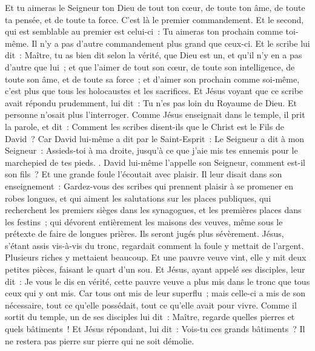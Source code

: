 \begin{multicols}{2}
Et tu aimeras le Seigneur ton Dieu de tout ton cœur, de toute ton âme, de toute ta pensée, et de toute ta force. C'est là le premier commandement.
Et le second, qui est semblable au premier est celui-ci~: Tu aimeras ton prochain comme toi-même. Il n'y a pas d'autre commandement plus grand que ceux-ci.
Et le scribe lui dit~: Maître, tu as bien dit selon la vérité, que Dieu est un, et qu'il n'y en a pas d'autre que lui~;
et que l'aimer de tout son cœur, de toute son intelligence, de toute son âme, et de toute sa force~; et d'aimer son prochain comme soi-même, c'est plus que tous les holocaustes et les sacrifices.
Et Jésus voyant que ce scribe avait répondu prudemment, lui dit~: Tu n'es pas loin du Royaume de Dieu. Et personne n'osait plus l'interroger.
Comme Jésus enseignait dans le temple, il prit la parole, et dit~: Comment les scribes disent-ils que le Christ est le Fils de David~?
Car David lui-même a dit par le Saint-Esprit~: Le Seigneur a dit à mon Seigneur~: Assieds-toi à ma droite, jusqu’à ce que j'aie mis tes ennemis pour le marchepied de tes pieds.
.
David lui-même l'appelle son Seigneur, comment est-il son fils~? Et une grande foule l'écoutait avec plaisir.
Il leur disait dans son enseignement~: Gardez-vous des scribes qui prennent plaisir à se promener en robes longues, et qui aiment les salutations sur les places publiques,
qui recherchent les premiers sièges dans les synagogues, et les premières places dans les festins~;
qui dévorent entièrement les maisons des veuves, même sous le prétexte de faire de longues prières. Ils seront jugés plus sévèrement.
Jésus, s'étant assis vis-à-vis du tronc, regardait comment la foule y mettait de l'argent. Plusieurs riches y mettaient beaucoup.
Et une pauvre veuve vint, elle y mit deux petites pièces, faisant le quart d'un sou.
Et Jésus, ayant appelé ses disciples, leur dit~: Je vous le dis en vérité, cette pauvre veuve a plus mis dans le tronc que tous ceux qui y ont mis.
Car tous ont mis de leur superflu~; mais celle-ci a mis de son nécessaire, tout ce qu'elle possédait, tout ce qu'elle avait pour vivre.
\VerseOne{}Comme il sortit du temple, un de ses disciples lui dit~: Maître, regarde quelles pierres et quels bâtiments~!
Et Jésus répondant, lui dit~: Vois-tu ces grands bâtiments~? Il ne restera pas pierre sur pierre qui ne soit démolie.

\end{multicols}
